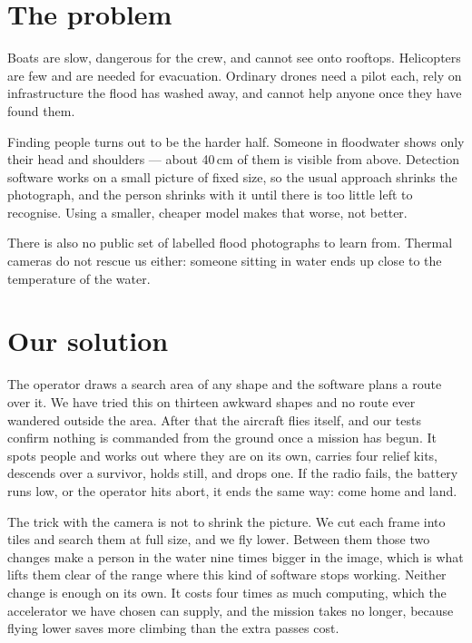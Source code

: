 \documentclass[11pt,a4paper]{article}
\begin{document}
\section{The problem}

Boats are slow, dangerous for the crew, and cannot see onto rooftops.
Helicopters are few and are needed for evacuation. Ordinary drones need a pilot
each, rely on infrastructure the flood has washed away, and cannot help anyone
once they have found them.

Finding people turns out to be the harder half. Someone in floodwater shows
only their head and shoulders --- about 40\,cm of them is visible from above.
Detection software works on a small picture of fixed size, so the usual
approach shrinks the photograph, and the person shrinks with it until there is
too little left to recognise. Using a smaller, cheaper model makes that worse,
not better.

There is also no public set of labelled flood photographs to learn from. Thermal
cameras do not rescue us either: someone sitting in water ends up close to the
temperature of the water.

\section{Our solution}

The operator draws a search area of any shape and the software plans a route
over it. We have tried this on thirteen awkward shapes and no route ever
wandered outside the area. After that the aircraft flies itself, and our tests
confirm nothing is commanded from the ground once a mission has begun. It spots
people and works out where they are on its own, carries four relief kits,
descends over a survivor, holds still, and drops one. If the radio fails, the
battery runs low, or the operator hits abort, it ends the same way: come home
and land.

The trick with the camera is not to shrink the picture. We cut each frame into
tiles and search them at full size, and we fly lower. Between them those two
changes make a person in the water nine times bigger in the image, which is
what lifts them clear of the range where this kind of software stops working.
Neither change is enough on its own. It costs four times as much computing,
which the accelerator we have chosen can supply, and the mission takes no
longer, because flying lower saves more climbing than the extra passes cost.
\end{document}
